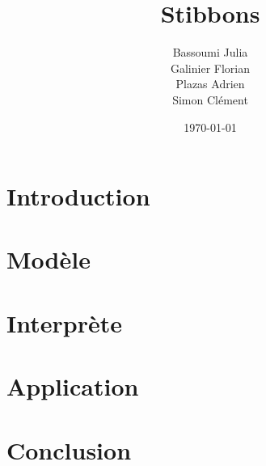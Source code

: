 \documentclass[11pt,handout]{beamer}
\title{Stibbons}
\author{Bassoumi Julia \\ Galinier Florian \\ Plazas Adrien \\ Simon Clément}
\date{\today}
\begin{document}
\begin{frame}
\titlepage
\end{frame}

\begin{frame}
\tableofcontents
\end{frame}

\section{Introduction}


\section{Modèle}


\section{Interprète}


\section{Application}


\section{Conclusion}

\end{document}
